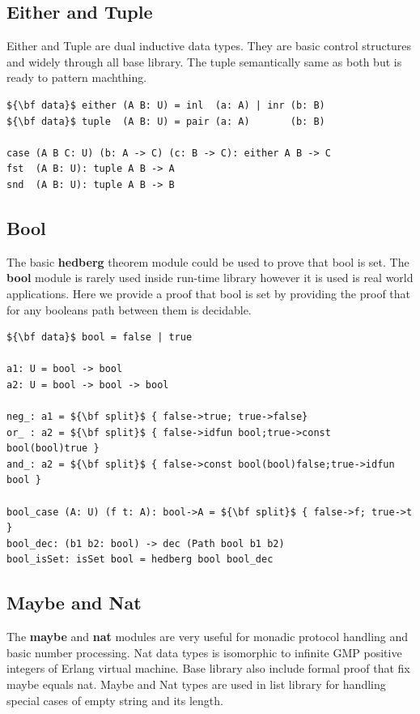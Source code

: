 \documentclass{article}
\begin{document}
\subsection{Either and Tuple}

Either and Tuple are dual inductive data types.
They are  basic control structures and widely through all base library.
The tuple semantically same as both but is ready to pattern machthing.

\begin{lstlisting}[mathescape=true]
${\bf data}$ either (A B: U) = inl  (a: A) | inr (b: B)
${\bf data}$ tuple  (A B: U) = pair (a: A)       (b: B)

case (A B C: U) (b: A -> C) (c: B -> C): either A B -> C
fst  (A B: U): tuple A B -> A
snd  (A B: U): tuple A B -> B
\end{lstlisting}

\subsection{Bool}

The basic {\bf hedberg} theorem module could be used to prove that bool is set.
The {\bf bool} module is rarely used inside run-time library
however it is used is real world applications. Here we provide a proof
that bool is set by providing the proof that for any booleans path
between them is decidable.

\begin{lstlisting}[mathescape=true]
${\bf data}$ bool = false | true

a1: U = bool -> bool
a2: U = bool -> bool -> bool

neg_: a1 = ${\bf split}$ { false->true; true->false}
or_ : a2 = ${\bf split}$ { false->idfun bool;true->const bool(bool)true }
and_: a2 = ${\bf split}$ { false->const bool(bool)false;true->idfun bool }

bool_case (A: U) (f t: A): bool->A = ${\bf split}$ { false->f; true->t }
bool_dec: (b1 b2: bool) -> dec (Path bool b1 b2)
bool_isSet: isSet bool = hedberg bool bool_dec
\end{lstlisting}

\subsection{Maybe and Nat}

The {\bf maybe} and {\bf nat} modules are very useful for monadic protocol handling
and basic number processing. Nat data types is isomorphic
to infinite GMP positive integers of Erlang virtual machine.
Base library also include formal proof that fix maybe equals nat.
Maybe and Nat types are used in list library for handling special cases
of empty string and its length.
\end{document}
